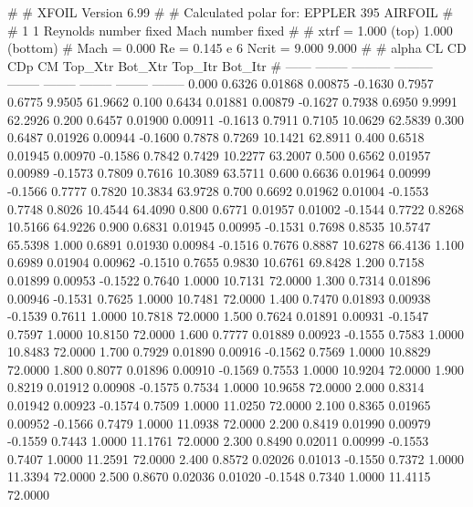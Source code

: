 #  
#       XFOIL         Version 6.99
#  
# Calculated polar for: EPPLER 395 AIRFOIL                              
#  
# 1 1 Reynolds number fixed          Mach number fixed         
#  
# xtrf =   1.000 (top)        1.000 (bottom)  
# Mach =   0.000     Re =     0.145 e 6     Ncrit =   9.000  9.000
#  
#   alpha    CL        CD       CDp       CM     Top_Xtr  Bot_Xtr  Top_Itr  Bot_Itr
#  ------ -------- --------- --------- -------- -------- -------- -------- --------
   0.000   0.6326   0.01868   0.00875  -0.1630   0.7957   0.6775   9.9505  61.9662
   0.100   0.6434   0.01881   0.00879  -0.1627   0.7938   0.6950   9.9991  62.2926
   0.200   0.6457   0.01900   0.00911  -0.1613   0.7911   0.7105  10.0629  62.5839
   0.300   0.6487   0.01926   0.00944  -0.1600   0.7878   0.7269  10.1421  62.8911
   0.400   0.6518   0.01945   0.00970  -0.1586   0.7842   0.7429  10.2277  63.2007
   0.500   0.6562   0.01957   0.00989  -0.1573   0.7809   0.7616  10.3089  63.5711
   0.600   0.6636   0.01964   0.00999  -0.1566   0.7777   0.7820  10.3834  63.9728
   0.700   0.6692   0.01962   0.01004  -0.1553   0.7748   0.8026  10.4544  64.4090
   0.800   0.6771   0.01957   0.01002  -0.1544   0.7722   0.8268  10.5166  64.9226
   0.900   0.6831   0.01945   0.00995  -0.1531   0.7698   0.8535  10.5747  65.5398
   1.000   0.6891   0.01930   0.00984  -0.1516   0.7676   0.8887  10.6278  66.4136
   1.100   0.6989   0.01904   0.00962  -0.1510   0.7655   0.9830  10.6761  69.8428
   1.200   0.7158   0.01899   0.00953  -0.1522   0.7640   1.0000  10.7131  72.0000
   1.300   0.7314   0.01896   0.00946  -0.1531   0.7625   1.0000  10.7481  72.0000
   1.400   0.7470   0.01893   0.00938  -0.1539   0.7611   1.0000  10.7818  72.0000
   1.500   0.7624   0.01891   0.00931  -0.1547   0.7597   1.0000  10.8150  72.0000
   1.600   0.7777   0.01889   0.00923  -0.1555   0.7583   1.0000  10.8483  72.0000
   1.700   0.7929   0.01890   0.00916  -0.1562   0.7569   1.0000  10.8829  72.0000
   1.800   0.8077   0.01896   0.00910  -0.1569   0.7553   1.0000  10.9204  72.0000
   1.900   0.8219   0.01912   0.00908  -0.1575   0.7534   1.0000  10.9658  72.0000
   2.000   0.8314   0.01942   0.00923  -0.1574   0.7509   1.0000  11.0250  72.0000
   2.100   0.8365   0.01965   0.00952  -0.1566   0.7479   1.0000  11.0938  72.0000
   2.200   0.8419   0.01990   0.00979  -0.1559   0.7443   1.0000  11.1761  72.0000
   2.300   0.8490   0.02011   0.00999  -0.1553   0.7407   1.0000  11.2591  72.0000
   2.400   0.8572   0.02026   0.01013  -0.1550   0.7372   1.0000  11.3394  72.0000
   2.500   0.8670   0.02036   0.01020  -0.1548   0.7340   1.0000  11.4115  72.0000
